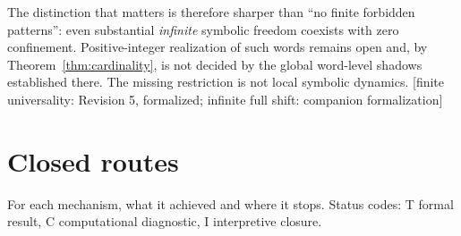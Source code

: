 \documentclass[11pt]{article}
\theoremstyle{plain}
\theoremstyle{definition}
\theoremstyle{remark}
\newcommand{\status}[1]{\textsf{\footnotesize[#1]}}
\begin{document}
The distinction that matters is therefore sharper than ``no finite forbidden patterns'': even
substantial \emph{infinite} symbolic freedom coexists with zero confinement. Positive-integer
realization of such words remains open and, by Theorem~\ref{thm:cardinality}, is not decided by the
global word-level shadows established there. The missing restriction is not local symbolic
dynamics.
\status{finite universality: Revision 5, formalized; infinite full shift: companion formalization}

\section{Closed routes}\label{sec:closed}

For each mechanism, what it achieved and where it stops. Status codes: \textsf{T} formal
result, \textsf{C} computational diagnostic, \textsf{I} interpretive closure.
\end{document}

